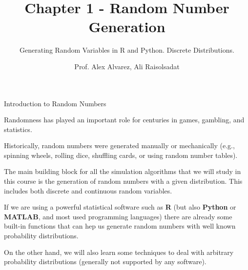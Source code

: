 \documentclass[8pt]{beamer}
\title{Chapter 1 - Random Number Generation}
\subtitle{Generating Random Variables in R and Python. Discrete Distributions.}
\author{Prof. Alex Alvarez, Ali Raisolsadat}
\institute{School of Mathematical and Computational Sciences \\ University of Prince Edward Island}
\date{} %
\begin{document}
\maketitle

\begin{frame}{Introduction to Random Numbers}
\vspace{1mm}

Randomness has played an important role for centuries in games, gambling, and statistics.

\vspace{1mm}

Historically, random numbers were generated manually or mechanically (e.g., spinning wheels, rolling dice, shuffling cards, or using random number tables).

\vspace{2mm}

The main building block for all the simulation algorithms that we will study in this course is the generation of random numbers with a given distribution. This includes both discrete and continuous random variables.
\vspace{1mm}

If we are using a powerful statistical software such as \textbf{R} (but also \textbf{Python} or \textbf{MATLAB}, and most used programming languages) there are already some built-in functions that can hep us generate random numbers with well known probability distributions.
\vspace{1mm}

On the other hand, we will also learn some techniques to deal with arbitrary probability distributions (generally not supported by any software).
\end{frame}
\end{document}

